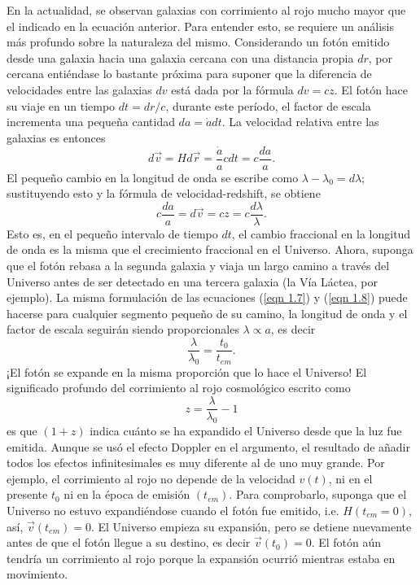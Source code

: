 \documentclass[a4paper,openright,12pt]{book}
\begin{document}
En la actualidad, se observan galaxias con corrimiento al rojo mucho mayor que el indicado en la ecuación anterior. Para entender esto, se requiere un análisis más profundo sobre la naturaleza del mismo. Considerando un fotón emitido desde una galaxia hacia una galaxia cercana con una distancia propia $dr$, por cercana entiéndase lo bastante próxima para suponer que la diferencia de velocidades entre las galaxias $dv$ está dada por la fórmula $dv = cz$. El fotón hace su viaje en un tiempo $dt = dr/c$, durante este período, el factor de escala incrementa una pequeña cantidad $da = \dot{a} dt$. La velocidad relativa entre las galaxias es entonces
\begin{equation}
d\vec{v}=Hd\vec{r}=\frac{\dot{a}}{a}cdt=c\frac{da}{a}.\label{eqn 1.7}
\end{equation}
El pequeño cambio en la longitud de onda se escribe como $ \lambda - \lambda_{0} = d\lambda$; sustituyendo esto y la fórmula de velocidad-redshift, se obtiene
\begin{equation}
c\frac{da}{a}=d\vec{v}=cz=c\frac{d\lambda}{\lambda}.\label{eqn 1.8}
\end{equation}
Esto es, en el pequeño intervalo de tiempo $dt$, el cambio fraccional en la longitud de onda es la misma que el crecimiento fraccional en el Universo. Ahora, suponga que el fotón rebasa a la segunda galaxia y viaja un largo camino a través del Universo antes de ser detectado en una tercera galaxia (la Vía Láctea, por ejemplo). La misma formulación de las ecuaciones (\ref{eqn 1.7}) y (\ref{eqn 1.8}) puede hacerse para cualquier segmento pequeño de su camino, la longitud de onda y el factor de escala seguirán siendo proporcionales $\lambda \propto a$, es decir
\begin{equation}
\frac{\lambda}{\lambda_{0}}= \frac{t_{0}}{t_{em}}.\label{eqn 1.9}
\end{equation}
¡El fotón se expande en la misma proporción que lo hace el Universo! El significado profundo del corrimiento al rojo cosmológico escrito como
\begin{equation}
z = \frac{\lambda}{\lambda_{0}} - 1\label{eqn 1.10}
\end{equation} 
es que $(1+z)$ indica cuánto se ha expandido el Universo desde que la luz fue emitida. Aunque se usó el efecto Doppler en el argumento, el resultado de añadir todos los efectos infinitesimales es muy diferente al de uno muy grande. Por ejemplo, el corrimiento al rojo no depende de la velocidad $v(t)$, ni en el presente $t_{0}$ ni en la época de emisión $(t_{em})$. Para comprobarlo, suponga que el Universo no estuvo expandiéndose cuando el fotón fue emitido, i.e. $H(t_{em}=0)$, así, $\vec{v}(t_{em})=0$. El Universo empieza su expansión, pero se detiene nuevamente antes de que el fotón llegue a su destino, es decir $\vec{v}(t_{0})=0$. El fotón aún tendría un corrimiento al rojo porque la expansión ocurrió mientras estaba en movimiento.
\end{document}
